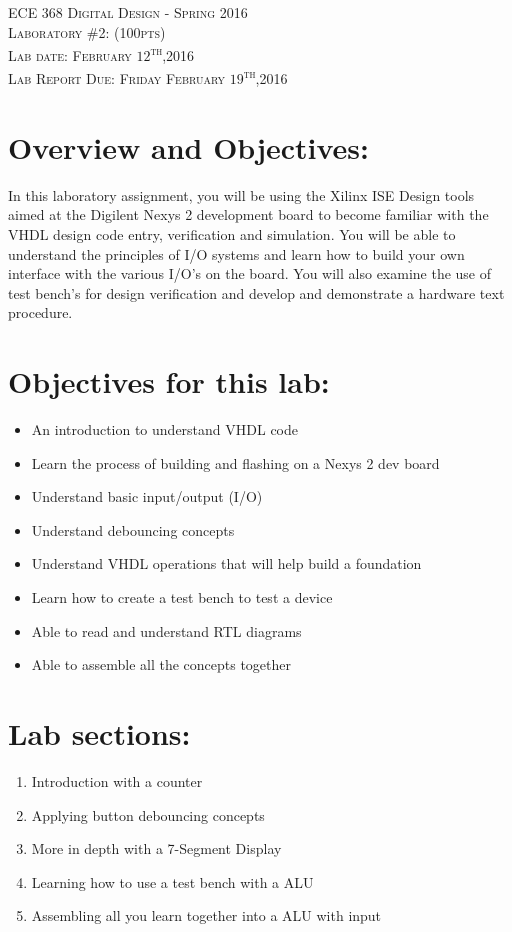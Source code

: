\documentclass{article}
\begin{document}
\begin{center}
\textsc{\huge ECE 368 Digital Design - Spring 2016}\\[1cm]
\textsc{{\LARGE Laboratory \#2: (100pts)}}\\[0.5cm]
\textsc{\Large Lab date: February $12$\textsuperscript{th},2016}\\[0.5cm]
\textsc{\Large Lab Report Due: Friday February $19$\textsuperscript{th},2016}\\[1cm]
\end{center}

\section{Overview and Objectives:}
In this laboratory assignment, you will be using the Xilinx ISE Design tools aimed at the Digilent Nexys 2 development board to become familiar with the VHDL design code entry, verification and simulation. You will be able to understand the principles of I/O systems and learn how to build your own interface with the various I/O's on the board. You will also examine the use of test bench's for design verification and develop and demonstrate a hardware text procedure.

\section{Objectives for this lab:}
\begin{itemize}
  \item An introduction to understand VHDL code
  \item Learn the process of building and flashing on a Nexys 2 dev board
  \item Understand basic input/output (I/O)
  \item Understand debouncing concepts
  \item Understand VHDL operations that will help build a foundation
  \item Learn how to create a test bench to test a device
  \item Able to read and understand RTL diagrams
  \item Able to assemble all the concepts together
\end{itemize}

\section{Lab sections:}
\begin{enumerate}
  \item Introduction with a counter
  \item Applying button debouncing concepts
  \item More in depth with a 7-Segment Display
  \item Learning how to use a test bench with a ALU
  \item Assembling all you learn together into a ALU with input
\end{enumerate}
\end{document}
